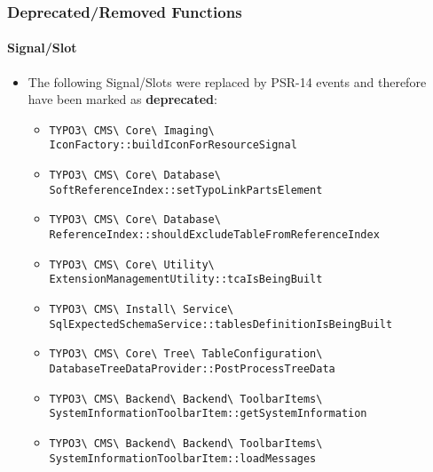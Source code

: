 \begin{frame}[fragile]
	\frametitle{Deprecated/Removed Functions}
	\framesubtitle{Signal/Slot}

	\lstset{basicstyle=\tiny\ttfamily}

	\begin{itemize}
		\item The following Signal/Slots were replaced by PSR-14 events and therefore have been marked as \textbf{deprecated}:
			\newline

			\begin{itemize}\tiny
				\item \texttt{TYPO3\textbackslash
					CMS\textbackslash
					Core\textbackslash
					Imaging\textbackslash
					IconFactory::buildIconForResourceSignal}
					\newline
				\item \texttt{TYPO3\textbackslash
					CMS\textbackslash
					Core\textbackslash
					Database\textbackslash
					SoftReferenceIndex::setTypoLinkPartsElement}
					\newline
				\item \texttt{TYPO3\textbackslash
					CMS\textbackslash
					Core\textbackslash
					Database\textbackslash
					ReferenceIndex::shouldExcludeTableFromReferenceIndex}
					\newline
				\item \texttt{TYPO3\textbackslash
					CMS\textbackslash
					Core\textbackslash
					Utility\textbackslash
					ExtensionManagementUtility::tcaIsBeingBuilt}
					\newline
				\item \texttt{TYPO3\textbackslash
					CMS\textbackslash
					Install\textbackslash
					Service\textbackslash
					SqlExpectedSchemaService::tablesDefinitionIsBeingBuilt}
					\newline
				\item \texttt{TYPO3\textbackslash
					CMS\textbackslash
					Core\textbackslash
					Tree\textbackslash
					TableConfiguration\textbackslash
					DatabaseTreeDataProvider::PostProcessTreeData}
					\newline
				\item \texttt{TYPO3\textbackslash
					CMS\textbackslash
					Backend\textbackslash
					Backend\textbackslash
					ToolbarItems\textbackslash
					SystemInformationToolbarItem::getSystemInformation}
					\newline
				\item \texttt{TYPO3\textbackslash
					CMS\textbackslash
					Backend\textbackslash
					Backend\textbackslash
					ToolbarItems\textbackslash
					SystemInformationToolbarItem::loadMessages}

			\end{itemize}

	\end{itemize}

\end{frame}

